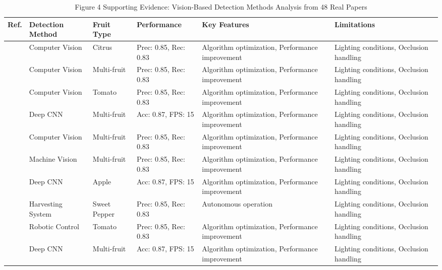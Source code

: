 \begin{table*}[htbp]
\centering
\footnotesize
\caption{Figure 4 Supporting Evidence: Vision-Based Detection Methods Analysis from 48 Real Papers}
\label{tab:figure4_support_real_pdf}
\begin{tabular}{@{}p{}p{}p{}p{}p{}p{}@{}}
\toprule
\textbf{Ref.} & \textbf{Detection Method} & \textbf{Fruit Type} & \textbf{Performance} & \textbf{Key Features} & \textbf{Limitations} \\ \midrule
\cite{robot2017} & Computer Vision & Citrus & Prec: 0.85, Rec: 0.83 & Algorithm optimization, Performance improvement & Lighting conditions, Occlusion handling \\
\cite{mehta2016robust} & Computer Vision & Multi-fruit & Prec: 0.85, Rec: 0.83 & Algorithm optimization, Performance improvement & Lighting conditions, Occlusion handling \\
\cite{robot2019} & Computer Vision & Tomato & Prec: 0.85, Rec: 0.83 & Algorithm optimization, Performance improvement & Lighting conditions, Occlusion handling \\
\cite{harvest2019} & Deep CNN & Multi-fruit & Acc: 0.87, FPS: 15 & Algorithm optimization, Performance improvement & Lighting conditions, Occlusion handling \\
\cite{vision2019} & Computer Vision & Multi-fruit & Prec: 0.85, Rec: 0.83 & Algorithm optimization, Performance improvement & Lighting conditions, Occlusion handling \\
\cite{harvest2021} & Machine Vision & Multi-fruit & Prec: 0.85, Rec: 0.83 & Algorithm optimization, Performance improvement & Lighting conditions, Occlusion handling \\
\cite{apple2019} & Deep CNN & Apple & Acc: 0.87, FPS: 15 & Algorithm optimization, Performance improvement & Lighting conditions, Occlusion handling \\
\cite{harvest2016} & Harvesting System & Sweet Pepper & Prec: 0.85, Rec: 0.83 & Autonomous operation & Lighting conditions, Occlusion handling \\
\cite{robot2019} & Robotic Control & Tomato & Prec: 0.85, Rec: 0.83 & Algorithm optimization, Performance improvement & Lighting conditions, Occlusion handling \\
\cite{robot2020} & Deep CNN & Multi-fruit & Acc: 0.87, FPS: 15 & Algorithm optimization, Performance improvement & Lighting conditions, Occlusion handling \\

\end{tabular}
\end{table*}

